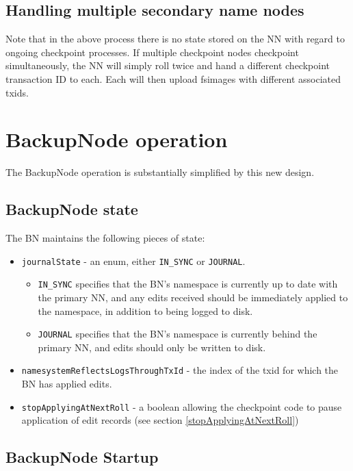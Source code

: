 \documentclass{article}
\begin{document}
\subsection{Handling multiple secondary name nodes}

Note that in the above process there is no state stored on the NN with regard to ongoing checkpoint processes. If multiple checkpoint nodes checkpoint simultaneously, the NN will simply roll twice and hand a different checkpoint transaction ID to each. Each will then upload fsimages with different associated txids.


\section{BackupNode operation}

The BackupNode operation is substantially simplified by this new design. 

\subsection{BackupNode state}

The BN maintains the following pieces of state:

\begin{itemize}
\item {\tt journalState} - an enum, either {\tt IN\_SYNC} or {\tt JOURNAL}.
  \begin{itemize}
  \item {\tt IN\_SYNC} specifies that the BN's namespace is currently up to date with the primary NN, and any edits received should be immediately applied to the namespace, in addition to being logged to disk.
  \item {\tt JOURNAL} specifies that the BN's namespace is currently behind the primary NN, and edits should only be written to disk.
  \end{itemize}
\item {\tt namesystemReflectsLogsThroughTxId} - the index of the txid for which the BN has applied edits.
\item {\tt stopApplyingAtNextRoll} - a boolean allowing the checkpoint code to pause application of edit records (see section \ref{stopApplyingAtNextRoll})
\end{itemize}

\subsection{BackupNode Startup}
\end{document}
